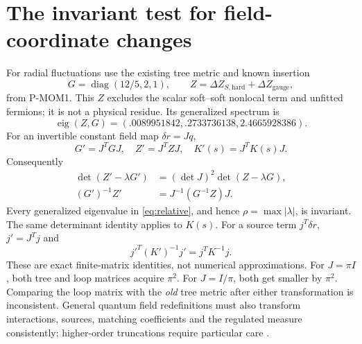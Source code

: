 \documentclass[11pt]{article}
\newcommand{\diag}{\operatorname{diag}}
\begin{document}
\section{The invariant test for field-coordinate changes}
For radial fluctuations use the existing tree metric and known insertion
\begin{equation}
 G=\diag(12/5,2,1),\qquad Z=\Delta Z_{S,\mathrm{hard}}+
                                      \Delta Z_{\mathrm{gauge}},
\end{equation}
from P-MOM1. This $Z$ excludes the scalar soft--soft nonlocal term and
unfitted fermions; it is not a physical residue. Its generalized spectrum is
\begin{equation}
 \operatorname{eig}(Z,G)=(.0089951842,.2733736138,2.4665928386).
 \label{eq:relative}
\end{equation}
For an invertible constant field map $\delta r=Jq$,
\begin{equation}
 G'=J^TGJ,\quad Z'=J^TZJ,\quad K'(s)=J^TK(s)J.
\end{equation}
Consequently
\begin{align}
 \det(Z'-\lambda G')&=(\det J)^2\det(Z-\lambda G),\\
 (G')^{-1}Z'&=J^{-1}(G^{-1}Z)J.
\end{align}
Every generalized eigenvalue in \eqref{eq:relative}, and hence
$\rho=\max|\lambda|$, is invariant. The same determinant identity
applies to $K(s)$. For a source term $j^T\delta r$, $j'=J^Tj$ and
\begin{equation}
 j'^T(K')^{-1}j'=j^TK^{-1}j.
\end{equation}
These are exact finite-matrix identities, not numerical approximations.
For $J=\pi I$, both tree and loop matrices acquire $\pi^2$.
For $J=I/\pi$, both get smaller by $\pi^2$. Comparing the loop matrix
with the \emph{old} tree metric after either transformation is inconsistent.
General quantum field redefinitions must also transform interactions,
sources, matching coefficients and the regulated measure consistently;
higher-order truncations require particular care \cite{Criado}.
\end{document}

